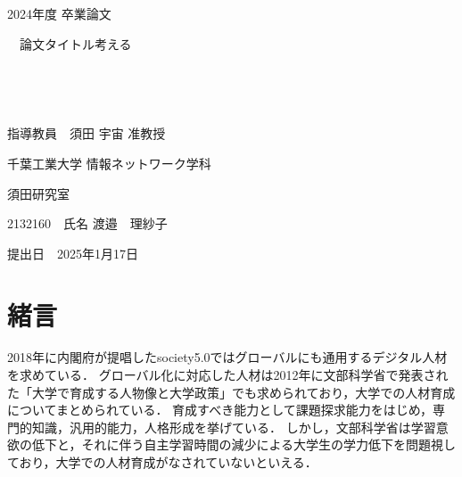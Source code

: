 \documentclass[12pt,a4j,titlepage]{ltjsarticle}
\begin{document}
\begin{titlepage}
  \begin{center}
  
    \vspace*{20truept}
    
    {\LARGE 2024年度 卒業論文} 
    
    \vspace*{75truept}
    
    {\Huge 　論文タイトル考える}　%

    \vspace{10truept}

    {\Huge }　%

    \vspace{10truept}

    {\Huge }　%

    \vspace{85truept}
    
    {\LARGE 指導教員　須田 宇宙 准教授}
    
    \vspace{60truept}
    
    {\LARGE 千葉工業大学 情報ネットワーク学科}
    
    \vspace{15truept}
    
    {\LARGE 須田研究室}
    
    \vspace{70truept}
    
    {\LARGE 2132160　氏名 渡邉　理紗子 }　%

    \vspace{70truept}
    
  \end{center}
  \begin{flushright}

    {\LARGE 提出日　2025年1月17日}
  
  \end{flushright}
\end{titlepage}

\setcounter{tocdepth}{3}
\tableofcontents
\listoftables
\listoffigures
\clearpage


\section{緒言}
2018年に内閣府が提唱したsociety5.0ではグローバルにも通用するデジタル人材を求めている\cite{naikaku}．
グローバル化に対応した人材は2012年に文部科学省で発表された「大学で育成する人物像と大学政策」でも求められており，大学での人材育成についてまとめられている．
育成すべき能力として課題探求能力をはじめ，専門的知識，汎用的能力，人格形成を挙げている\cite{monka1}．
しかし，文部科学省は学習意欲の低下と，それに伴う自主学習時間の減少による大学生の学力低下を問題視しており\cite{monka2}，大学での人材育成がなされていないといえる．
\end{document}
